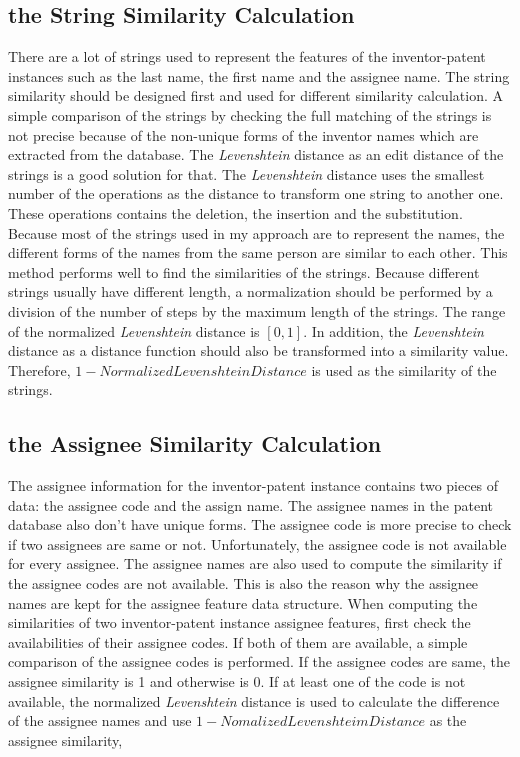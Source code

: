\subsection{the String Similarity Calculation}
There are a lot of strings used to represent the features of the inventor-patent instances such as the last name, the first name and the assignee name. The string similarity should be designed first and used for different similarity calculation. A simple comparison of the strings by checking the full matching of the strings is not precise because of the non-unique forms of the inventor names which are extracted from the database. The \emph{Levenshtein} distance as an edit distance of the strings is a good solution for that. The \emph{Levenshtein} distance uses the smallest number of the operations as the distance to transform one string to another one. These operations contains the deletion, the insertion and the substitution.  Because most of the strings used in my approach are to represent the names, the different forms of the names from the same person are similar to each other. This method performs well to find the similarities of the strings. Because different strings usually have different length, a normalization should be performed by a division of the number of steps by the maximum length of the strings. The range of the normalized \emph{Levenshtein} distance is $[0,1]$. In addition, the \emph{Levenshtein} distance as a distance function should also be transformed into a similarity value. Therefore, $1-Normalized Levenshtein Distance$ is used as the similarity of the strings. 


\subsection{the Assignee Similarity Calculation}
The assignee information for the inventor-patent instance contains two pieces of data: the assignee code and the assign name. The assignee names in the patent database also don't have unique forms. The assignee code is more precise to check if two assignees are same or not. Unfortunately, the assignee code is not available for every assignee. The assignee names are also used to compute the similarity if the assignee codes are not available. This is also the reason why the assignee names are kept for the assignee feature data structure. When computing the similarities of two inventor-patent instance assignee features, first check the availabilities of their assignee codes. If both of them are available, a simple comparison of the assignee codes is performed. If the assignee codes are same, the assignee similarity is 1 and otherwise is 0. If at least one of the code is not available, the normalized \emph{Levenshtein} distance is used to calculate the difference of the assignee names and use $1-Nomalized Levenshteim Distance$ as the assignee similarity,


